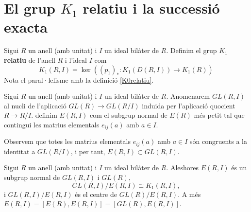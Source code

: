 \section{El grup $K_1$ relatiu i la successió exacta}
\begin{definition}
Sigui $R$ un anell (amb unitat) i $I$ un ideal bilàter de $R$. Definim el grup $K_1$ \textbf{relatiu} de l'anell $R$ i l'ideal $I$ com 
$$
K_1(R,I) = \ker ((p_1)_* : K_1(D(R,I)) \rightarrow K_1(R))
$$
Nota el paral·lelisme amb la definició \ref{K0relatiu}.
\end{definition}

\begin{definition}
Sigui $R$ un anell (amb unitat) i $I$ un ideal bilàter de $R$. Anomenarem $GL(R,I)$ al nucli de l'aplicació $GL(R)\rightarrow GL(R/I)$ induida per l'aplicació quocient $R\rightarrow R/I$. definim $E(R,I)$ com el subgrup normal de $E(R)$ més petit tal que contingui les matrius elementals $e_{ij}(a)$ amb $a\in I$.
\end{definition}

\begin{obs}
Observem que totes les matrius elementals $e_{ij}(a)$ amb $a\in I$ són congruents a la identitat a $GL(R/I)$, i per tant, $E(R,I)\subset GL(R,I)$.
\end{obs}

\begin{theorem}
Sigui $R$ un anell (amb unitat) i $I$ un ideal bilàter de $R$. Aleshores $E(R,I)$ és un subgrup normal de $GL(R,I)$ i $GL(R)$,
$$
GL(R,I)/E(R,I) \cong K_1(R,I),
$$
i $GL(R,I)/E(R,I)$ és el centre de $GL(R)/E(R,I)$. A més $E(R,I)=[E(R),E(R,I)]=[GL(R), E(R,I)]$.
\end{theorem}

